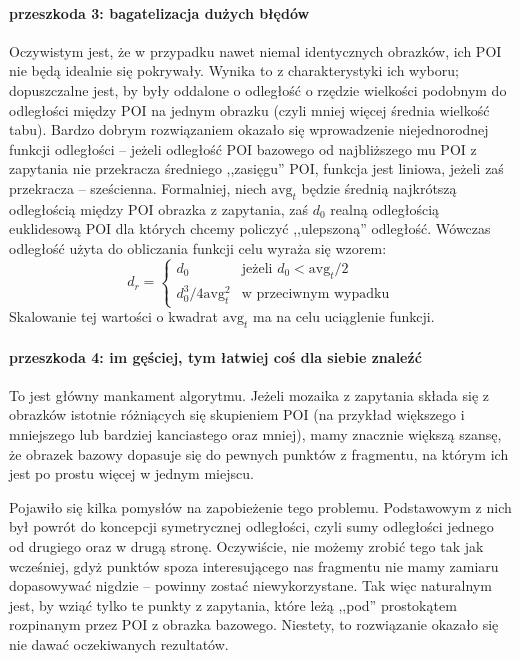 \documentclass[a4paper,12pt,leqno]{article}
\begin{document}
\paragraph{przeszkoda 3: bagatelizacja dużych błędów}
Oczywistym jest, że w przypadku nawet niemal identycznych obrazków, ich POI nie będą idealnie się pokrywały. Wynika to z charakterystyki ich wyboru; dopuszczalne jest, by były oddalone
o odległość o rzędzie wielkości podobnym do odległości między POI na jednym obrazku (czyli mniej więcej średnia wielkość tabu). 
Bardzo dobrym rozwiązaniem okazało się wprowadzenie niejednorodnej funkcji odległości -- jeżeli odległość POI bazowego od najbliższego mu POI z zapytania nie przekracza średniego ,,zasięgu''
POI, funkcja jest liniowa, jeżeli zaś przekracza -- sześcienna.
Formalniej, niech $\mathrm{avg}_t$ będzie średnią najkrótszą odległością między POI obrazka z zapytania, zaś $d_0$ realną odległością euklidesową POI dla których chcemy policzyć ,,ulepszoną'' odległość.
Wówczas odległość użyta do obliczania funkcji celu wyraża się wzorem:
\[ d_r = \begin{cases}
	    d_0 & \text{jeżeli } d_0 < \mathrm{avg}_t / 2 \\
	    d_0^3 / 4\mathrm{avg}_t^2 & \text{w przeciwnym wypadku}
	 \end{cases} \]
Skalowanie tej wartości o kwadrat $\mathrm{avg}_t$ ma na celu uciąglenie funkcji.

\paragraph{przeszkoda 4: im gęściej, tym łatwiej coś dla siebie znaleźć}
To jest główny mankament algorytmu. Jeżeli mozaika z zapytania składa się z obrazków istotnie różniących się skupieniem POI 
(na przykład większego i mniejszego lub bardziej kanciastego oraz mniej), mamy znacznie większą szansę, że obrazek bazowy dopasuje się do pewnych punktów z fragmentu, 
na którym ich jest po prostu więcej w jednym miejscu.

Pojawiło się kilka pomysłów na zapobieżenie tego problemu. Podstawowym z nich był powrót do koncepcji symetrycznej odległości, czyli sumy odległości jednego od drugiego oraz w drugą stronę.
Oczywiście, nie możemy zrobić tego tak jak wcześniej, gdyż punktów spoza interesującego nas fragmentu nie mamy zamiaru dopasowywać nigdzie -- powinny zostać niewykorzystane.
Tak więc naturalnym jest, by wziąć tylko te punkty z zapytania, które leżą ,,pod'' prostokątem rozpinanym przez POI z obrazka bazowego. Niestety, to rozwiązanie okazało się nie dawać 
oczekiwanych rezultatów.
\end{document}
